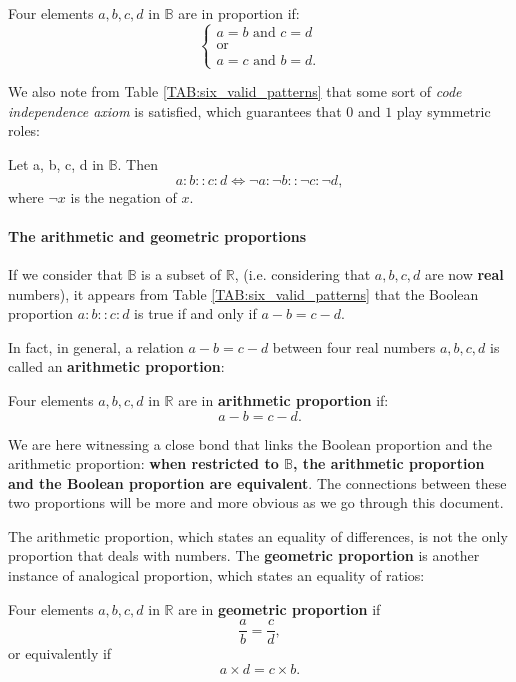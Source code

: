\begin{definition}
  \label{DEF:boolean_proportion_informal}
  Four elements $a, b, c, d$ in $\mathbb{B}$ are in proportion if:
  $$
  \begin{cases}
    a = b \text{ and } c = d\\
    \text{or}\\
    a = c \text{ and } b = d.
  \end{cases}
  $$
\end{definition}

We also note from Table \ref{TAB:six_valid_patterns} that some sort of {\it
code independence axiom} is satisfied, which guarantees that $0$ and $1$ play
symmetric roles:

\begin{property}
  Let a, b, c, d in $\mathbb{B}$. Then
  $$a : b :: c : d \iff \neg a :  \neg b ::  \neg c :  \neg d,$$
  where $\neg x$ is the negation of $x$.
\end{property}

\paragraph{The arithmetic and geometric proportions\\}

If we consider that $\mathbb{B}$ is a subset of $\mathbb{R}$, (i.e. considering
that $a, b, c, d$ are now \textbf{real} numbers), it appears from Table
\ref{TAB:six_valid_patterns} that the Boolean proportion $a:b::c:d$ is true if
and only if $a - b = c - d$.

In fact, in general, a relation $a - b = c - d$ between four real numbers $a,
b, c, d$ is called an \textbf{arithmetic proportion}:
\begin{definition}
  Four elements $a, b, c, d$ in $\mathbb{R}$ are in \textbf{arithmetic
  proportion} if:
  $$a - b = c - d.$$
\end{definition}
We are here witnessing a close bond that links the Boolean proportion and the
arithmetic proportion: \textbf{when restricted to $\mathbb{B}$, the arithmetic
proportion and the Boolean proportion are equivalent}. The connections between
these two proportions will be more and more obvious as we go through this
document.

The arithmetic proportion, which states an equality of differences, is not the
only proportion that deals with numbers. The \textbf{geometric proportion} is
another instance of analogical proportion, which states an equality of ratios:
\begin{definition}
  Four elements $a, b, c, d$ in $\mathbb{R}$ are in \textbf{geometric
  proportion} if
  $$\frac{a}{b} = \frac{c}{d},$$
  or equivalently if
  $$a\times d = c\times b.$$
\end{definition}

